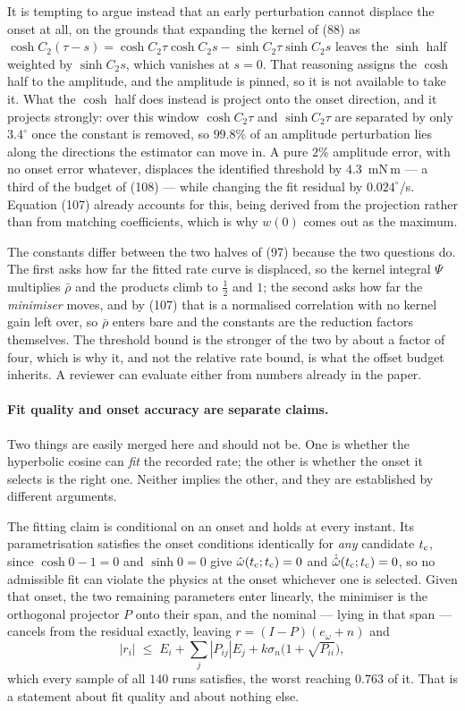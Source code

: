 \documentclass[10pt]{article}
\newcommand{\tc}{t_{\rm c}}
\begin{document}
It is tempting to argue instead that an early perturbation cannot
displace the onset at all, on the grounds that expanding the kernel of
(88) as $\cosh C_2(\tau-s) = \cosh C_2\tau\cosh C_2 s - \sinh C_2\tau
\sinh C_2 s$ leaves the $\sinh$ half weighted by $\sinh C_2s$, which
vanishes at $s = 0$. That reasoning assigns the $\cosh$ half to the
amplitude, and the amplitude is pinned, so it is not available to take
it. What the $\cosh$ half does instead is project onto the onset
direction, and it projects strongly: over this window $\cosh C_2\tau$
and $\sinh C_2\tau$ are separated by only $3.4^\circ$ once the constant
is removed, so $99.8\%$ of an amplitude perturbation lies along the
directions the estimator can move in. A pure $2\%$ amplitude error,
with no onset error whatever, displaces the identified threshold by
$4.3$~mN\,m --- a third of the budget of (108) --- while changing the
fit residual by $0.024^\circ$/s. Equation (107) already accounts for
this, being derived from the projection rather than from matching
coefficients, which is why $w(0)$ comes out as the maximum.

The constants differ between the two halves of (97) because the two
questions do. The first asks how far the fitted rate curve is
displaced, so the kernel integral $\Psi$ multiplies $\bar\rho$ and the
products climb to $\tfrac12$ and $1$; the second asks how far the
\emph{minimiser} moves, and by (107) that is a normalised correlation
with no kernel gain left over, so $\bar\rho$ enters bare and the
constants are the reduction factors themselves. The threshold bound is
the stronger of the two by about a factor of four, which is why it,
and not the relative rate bound, is what the offset budget inherits. A
reviewer can evaluate either from numbers already in the paper.

\paragraph{Fit quality and onset accuracy are separate claims.}
Two things are easily merged here and should not be. One is whether the
hyperbolic cosine can \emph{fit} the recorded rate; the other is whether
the onset it selects is the right one. Neither implies the other, and
they are established by different arguments.

The fitting claim is conditional on an onset and holds at every instant.
Its parametrisation satisfies the onset conditions identically for
\emph{any} candidate $\tc$, since $\cosh 0 - 1 = 0$ and $\sinh 0 = 0$
give $\hat\omega(\tc;\tc) = 0$ and $\dot{\hat\omega}(\tc;\tc) = 0$, so
no admissible fit can violate the physics at the onset whichever one is
selected. Given that onset, the two remaining parameters enter linearly,
the minimiser is the orthogonal projector $P$ onto their span, and the
nominal --- lying in that span --- cancels from the residual exactly,
leaving $r = (I-P)(e_\omega+n)$ and
\begin{equation}
  |r_i| \;\le\; E_i + \sum_j|P_{ij}|E_j
        + k\sigma_n\bigl(1+\sqrt{P_{ii}}\bigr),
  \tag{109}
\end{equation}
which every sample of all $140$ runs satisfies, the worst reaching
$0.763$ of it. That is a statement about fit quality and about nothing
else.
\end{document}
